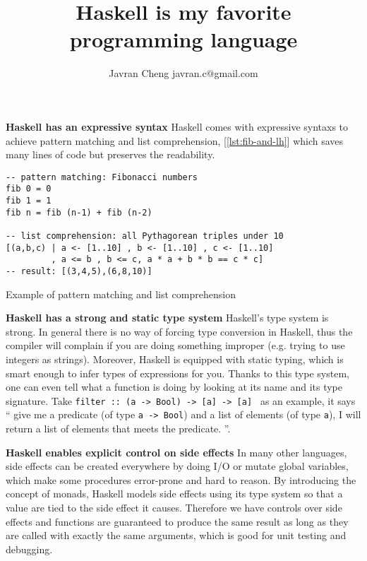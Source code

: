\documentclass[11pt,a4paper]{article}
\title{Haskell is my favorite programming language}
\author{Javran Cheng javran.c@gmail.com}
\date{}
\begin{document}
\maketitle
\thispagestyle{empty}

\textbf{Haskell has an expressive syntax}
Haskell comes with expressive syntaxs to achieve
pattern matching and list comprehension, [\ref{lst:fib-and-lh}]
which saves many lines of code but preserves the readability.

\begin{listing}
\begin{verbatim}
-- pattern matching: Fibonacci numbers
fib 0 = 0
fib 1 = 1
fib n = fib (n-1) + fib (n-2)

-- list comprehension: all Pythagorean triples under 10
[(a,b,c) | a <- [1..10] , b <- [1..10] , c <- [1..10]
         , a <= b , b <= c, a * a + b * b == c * c]
-- result: [(3,4,5),(6,8,10)]
\end{verbatim}
\caption{Example of pattern matching and list comprehension}
\label{lst:fib-and-lh}
\end{listing}

\textbf{Haskell has a strong and static type system}
Haskell's type system is strong. In general there is no
way of forcing type conversion in Haskell,
thus the compiler will complain if you are doing something improper
(e.g. trying to use integers as strings). 
Moreover, Haskell is equipped with static typing, which is smart enough to
infer types of expressions for you.
Thanks to this type system, one can even tell what a function is doing
by looking at its name and its type signature. Take
\texttt{filter :: (a -> Bool) -> [a] -> [a] }
as an example, it says ``
give me a predicate (of type \texttt{a -> Bool}) and a list of elements
(of type \texttt{a}), I will return a list of elements that meets the predicate.
''.

\textbf{Haskell enables explicit control on side effects}
In many other languages, side effects can be created everywhere
by doing I/O or mutate global variables, which make some procedures
error-prone and hard to reason.
By introducing the concept of monads, Haskell models side effects using
its type system so that a value are tied to the side effect it causes.
Therefore we have controls over side effects and
functions are guaranteed to produce the same result
as long as they are called with exactly the same arguments,
which is good for unit testing and debugging.

\end{document}
